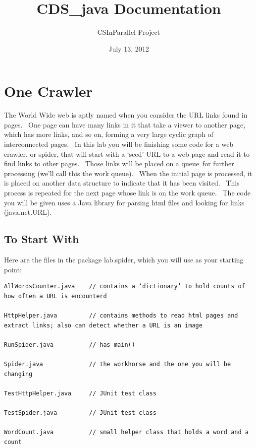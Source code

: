 \documentclass[letterpaper,10pt,openany,oneside]{sphinxmanual}
\title{CDS\_java Documentation}
\date{July 13, 2012}
\author{CSInParallel Project}
\begin{document}
\maketitle
\tableofcontents
{}\label{index::doc}



\chapter{One Crawler}
\label{TheSpiderLabonecrawler/TheSpiderLabonecrawler:one-crawler}\label{TheSpiderLabonecrawler/TheSpiderLabonecrawler::doc}\label{TheSpiderLabonecrawler/TheSpiderLabonecrawler:the-spider-lab}
The World Wide web is aptly named when you consider the URL links
found in pages.  One page can have many links in it that take a
viewer to another page, which has more links, and so on, forming a
very large cyclic graph of interconnected pages.  In this lab you
will be finishing some code for a web crawler, or spider, that will
start with a ‘seed’ URL to a web page and read it to find links to
other pages.  Those links will be placed on a queue for further
processing (we’ll call this the work queue).  When the initial page
is processed, it is placed on another data structure to indicate
that it has been visited.  This process is repeated for the next
page whose link is on the work queue.  The code you will be given
uses a Java library for parsing html files and looking for links
(java.net.URL).


\section{To Start With}
\label{TheSpiderLabonecrawler/TheSpiderLabonecrawler:to-start-with}
Here are the files in the package lab.spider, which you will use as
your starting point:

\begin{Verbatim}[commandchars=\\\{\}]
AllWordsCounter.java    // contains a ‘dictionary’ to hold counts of how often a URL is encounterd

HttpHelper.java         // contains methods to read html pages and extract links; also can detect whether a URL is an image

RunSpider.java          // has main()

Spider.java             // the workhorse and the one you will be changing

TestHttpHelper.java     // JUnit test class

TestSpider.java         // JUnit test class

WordCount.java          // small helper class that holds a word and a count
\end{Verbatim}
\end{document}
